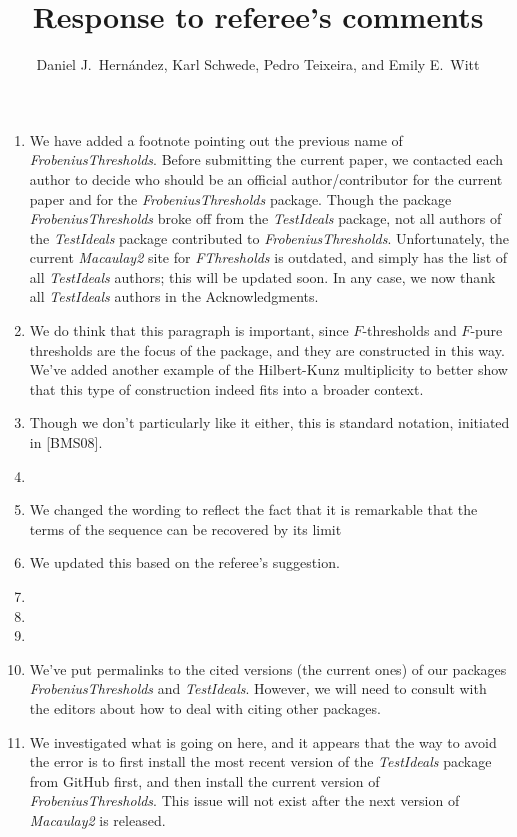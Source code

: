 \documentclass{amsart}
\begin{document}
\title{Response to referee's comments}
\author{Daniel J.\ Hern\'andez,  Karl Schwede, Pedro Teixeira, and Emily E.\ Witt}
\maketitle

\begin{enumerate}
\item We have added a footnote pointing out the previous name of \emph{FrobeniusThresholds}.  Before submitting the current paper, we contacted each author to decide who should be an official author/contributor for the current paper and for the \emph{FrobeniusThresholds} package.
Though the package \emph{FrobeniusThresholds} broke off from the \emph{TestIdeals} package, not all authors of the \emph{TestIdeals} package contributed to \emph{FrobeniusThresholds}.
Unfortunately, the current \emph{Macaulay2} site for \emph{FThresholds} is outdated, and simply has the list of all \emph{TestIdeals} authors; this will be updated soon. 
In any case, we now thank all \emph{TestIdeals} authors in the Acknowledgments. 
\item We do think that this paragraph is important, since $F$-thresholds and $F$-pure thresholds are the focus of the package, and they are constructed in this way.  We've added another example of the Hilbert-Kunz multiplicity to better show that this type of construction indeed fits into a broader context. 
\item Though we don't particularly like it either, this is standard notation, initiated in [BMS08].
\item 
\item We changed the wording to reflect the fact that it is remarkable that the terms of the sequence can be recovered by its limit 
\item We updated this based on the referee's suggestion. 
\item
\item
\item
\item We've put permalinks to the cited versions (the current ones) of our packages  \emph{FrobeniusThresholds} and \emph{TestIdeals}. 
However, we will need to consult with the editors about how to deal with citing other packages.  
\item We investigated what is going on here, and it appears that the way to avoid the error is to first install the most recent version of the \emph{TestIdeals} package from GitHub first, and then install the current version of \emph{FrobeniusThresholds}. 
This issue will not exist after the next version of \emph{Macaulay2} is released.

\end{enumerate}
\end{document}
